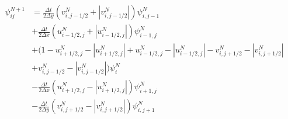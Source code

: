 \documentclass[12pt, a4paper]{article}
\newcommand{\abs}[1]{\left\lvert#1\right\rvert}
\begin{document}
\begin{equation}
\begin{split}
\psi_{ij}^{N+1} &= 
\frac{\Delta t}{2 \Delta y} \left( v_{i,j-1/2}^N + \abs{v_{i,j-1/2}^N} \right) \psi_{i,j-1}^N\\
&+\frac{\Delta t}{2 \Delta x} \left( u_{i-1/2,j}^N + \abs{u_{i-1/2,j}^N} \right) \psi_{i-1,j}^N\\
&+ \Big(1 - u_{i+1/2,j}^N - \abs{u_{i+1/2,j}^N} + u_{i-1/2,j}^N - \abs{u_{i-1/2,j}^N} - v_{i,j+1/2}^N - \abs{v_{i,j+1/2}^N} \\
&+ v_{i,j-1/2}^N - \abs{v_{i,j-1/2}^N} \Big) \psi_i^N\\ 
&-\frac{\Delta t}{2 \Delta x} \left( u_{i+1/2,j}^N - \abs{u_{i+1/2,j}^N} \right) \psi_{i+1,j}^N\\
&-\frac{\Delta t}{2 \Delta y} \left( v_{i,j+1/2}^N - \abs{v_{i,j+1/2}^N} \right) \psi_{i,j+1}^N\\
\end{split}
\end{equation}
\end{document}
